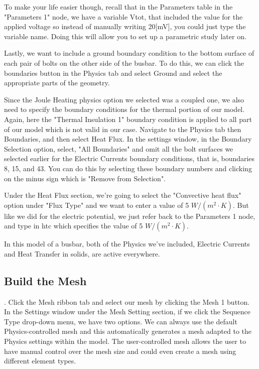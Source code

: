 To make your life easier though, recall that in the Parameters table in the "Parameters 1" node, we have a variable Vtot, that included the value for the applied voltage so instead of manually writing 20[mV], you could just type the variable name. Doing this will allow you to set up a parametric study later on.

Lastly, we want to include a ground boundary condition to the bottom surface of each pair of bolts on the other side of the busbar. To do this, we can click the boundaries button in the Physics tab and select Ground and select the appropriate parts of the geometry.


Since the Joule Heating physics option we selected was a coupled one, we also need to specify the boundary conditions for the thermal portion of our model. Again, here the "Thermal Insulation 1" boundary condition is applied to all part of our model which is not valid in our case. Navigate to the Physics tab then Boundaries, and then select Heat Flux. In the settings window, in the Boundary Selection option, select, "All Boundaries" and omit all the bolt surfaces we selected earlier for the Electric Currents boundary conditions, that is, boundaries 8, 15, and 43. You can do this by selecting these boundary numbers and clicking on the minus sign which is "Remove from Selection".

Under the Heat Flux section, we're going to select the "Convective heat flux" option under "Flux Type" and we want to enter a value of 5 $W/(m^2\cdot K)$. But like we did for the electric potential, we just refer back to the Parameters 1 node, and type in htc which specifies the value of 5 $W/(m^2\cdot K)$.


In this model of a busbar, both of the Physics we've included, Electric Currents and Heat Transfer in solids, are active everywhere.

\subsection{Build the Mesh}.
Click the Mesh ribbon tab and select our mesh by clicking the Mesh 1 button. In the Settings window under the Mesh Setting section, if we click the Sequence Type drop-down menu, we have two options. We can always use the default Physics-controlled mesh and this automatically generates a mesh adapted to the Physics settings within the model. The user-controlled mesh allows the user to have manual control over the mesh size and could even create a mesh using different element types.

